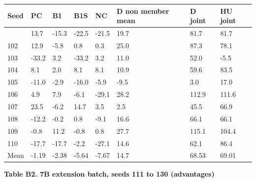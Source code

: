 \documentclass[11pt]{article}
\begin{document}
{\def\LTcaptype{none} %
\begin{longtable}[]{@{}llllllll@{}}
\toprule\noalign{}
Seed & PC & B1 & B1S & NC & D non member mean & D joint & HU joint \\
\midrule\noalign{}
\endhead
\bottomrule\noalign{}
\endlastfoot
101 & 13.7 & -15.3 & -22.5 & -21.5 & 19.7 & 81.7 & 81.7 \\
102 & 12.9 & -5.8 & 0.8 & 0.3 & 25.0 & 87.3 & 78.1 \\
103 & -33.2 & 3.2 & -33.2 & 3.2 & 11.0 & 52.0 & -5.5 \\
104 & 8.1 & 2.0 & 8.1 & 8.1 & 10.9 & 59.6 & 83.5 \\
105 & -11.0 & -2.9 & -16.0 & -5.9 & -9.5 & 3.0 & 17.0 \\
106 & 4.9 & 7.9 & -6.1 & -29.1 & 28.2 & 112.9 & 111.6 \\
107 & 23.5 & -6.2 & 14.7 & 3.5 & 2.5 & 45.5 & 66.9 \\
108 & -12.2 & -0.2 & 0.8 & -9.1 & 16.6 & 66.1 & 66.1 \\
109 & -0.8 & 11.2 & -0.8 & 0.8 & 27.7 & 115.1 & 104.4 \\
110 & -17.7 & -17.7 & -2.2 & -27.1 & 14.6 & 62.1 & 86.4 \\
Mean & -1.19 & -2.38 & -5.64 & -7.67 & 14.7 & 68.53 & 69.01 \\
\end{longtable}
}

\textbf{Table B2. 7B extension batch, seeds 111 to 130 (advantages)}
\end{document}
